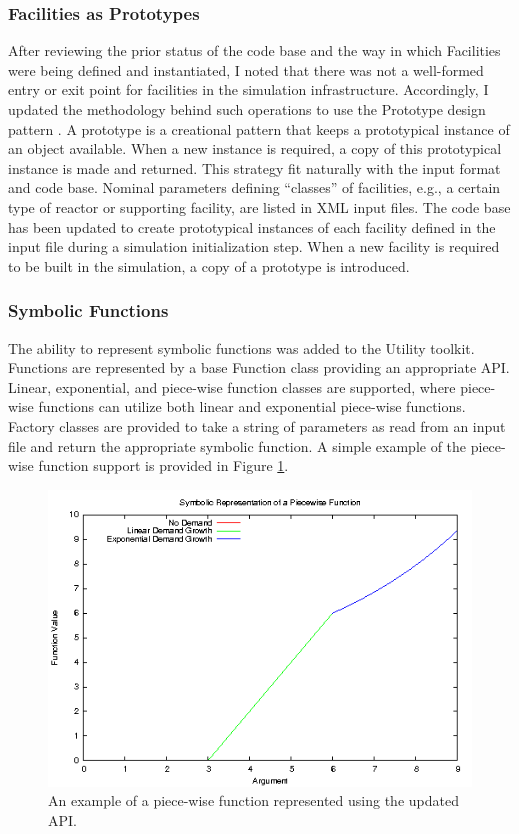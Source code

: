 \subsubsection{Facilities as Prototypes}
After reviewing the prior status of the code base and the way in which
Facilities were being defined and instantiated, I noted that there was not a
well-formed entry or exit point for facilities in the simulation
infrastructure. Accordingly, I updated the methodology behind such operations to
use the Prototype design pattern \cite{vlissides_design_1995}. A prototype is a
creational pattern that keeps a prototypical instance of an object
available. When a new instance is required, a copy of this prototypical instance
is made and returned. This strategy fit naturally with the \Cyclus input format
and code base. Nominal parameters defining ``classes'' of facilities, e.g., a
certain type of reactor or supporting facility, are listed in XML input
files. The code base has been updated to create prototypical instances of each
facility defined in the input file during a simulation initialization step. When
a new facility is required to be built in the simulation, a copy of a prototype
is introduced.

\subsubsection{Symbolic Functions}

The ability to represent symbolic functions was added to the \Cyclus Utility
toolkit. Functions are represented by a base Function class providing an
appropriate API. Linear, exponential, and piece-wise function classes are
supported, where piece-wise functions can utilize both linear and exponential
piece-wise functions. Factory classes are provided to take a string of parameters
as read from an input file and return the appropriate symbolic function. A
simple example of the piece-wise function support is provided in Figure
\ref{fig:piecewise}.

\begin{figure}[H]
  \begin{center}
    \includegraphics[width=\linewidth]{./chapters/prevwork/piecewise.png}
  \caption{An example of a piece-wise function represented using the updated API.}
  \label{fig:piecewise}
  \end{center}
\end{figure}

